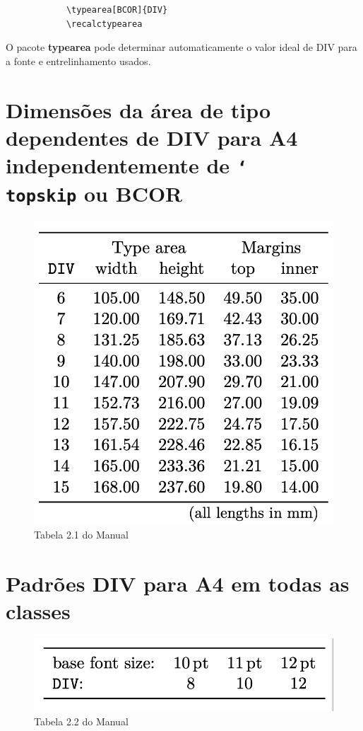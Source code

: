 \begin{verbatim}
            \typearea[BCOR]{DIV}
            \recalctypearea
\end{verbatim}


O pacote \textbf{typearea} pode determinar automaticamente o valor ideal de DIV para a fonte e entrelinhamento usados.

\section[Dimensões da área de tipo]{Dimensões da área de tipo dependentes de DIV para A4 independentemente de \texttt{\char`\\topskip} ou BCOR}


\begin{figure}[ht]
    \centering
    \includegraphics[width=0.45\linewidth]{imagens/tab2_1.png}
    \caption{Tabela 2.1 do Manual}
    \label{fig:tab2_1}
\end{figure}

\section[Padrões DIV para A4]{Padrões DIV para A4 em todas as classes \KOMAScript\:}
\begin{figure}[hb]
    \centering
    \includegraphics[width=0.5\linewidth]{imagens/tab2_2.png}
    \caption{Tabela 2.2 do Manual}
    \label{fig:tab2_2}
\end{figure}

